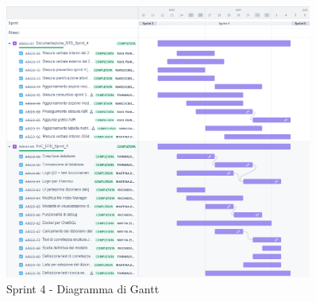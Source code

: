 \begin{figure}[H]
  \centering
  \includegraphics[width=0.90\textwidth]{assets/Pianificazione/Sprint-4/gantt.png}
  \caption{Sprint 4 - Diagramma di Gantt}\label{fig:sprint-4-gantt}
\end{figure}